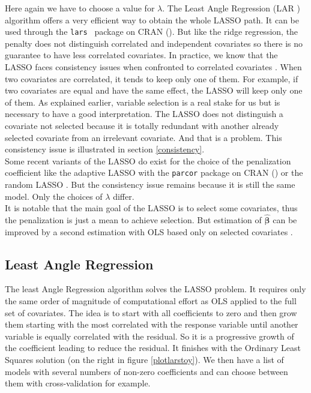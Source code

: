 \documentclass[12pt,a4paper]{report}
\begin{document}
		Here again we have to choose a value for $\lambda$.
	 The Least Angle Regression (\textsc{LAR} \cite{efron2004least}) algorithm offers a very efficient way to obtain the whole LASSO path.  It can be used through the {\tt lars } package on CRAN (\cite{packagelars}). But like the ridge regression, the penalty does not distinguish correlated and independent covariates so there is no guarantee to have less correlated covariates. In practice, we know that the LASSO faces consistency issues when confronted to correlated covariates \cite{Zhao2006MSC}. When two covariates are correlated, it tends to keep only one of them. For example, if two covariates are equal and have the same effect, the LASSO will keep only one of them. As explained earlier, variable selection is a real stake for us but is necessary to have a good interpretation. The LASSO does not distinguish a covariate not selected because it is totally redundant with another already selected covariate from an irrelevant covariate. And that is a problem. This consistency issue is illustrated in section \ref{consistency}.\\



			 Some recent variants of the \textsc{LASSO} do exist for the choice of the penalization coefficient like the adaptive \textsc{LASSO} \cite{zou2006adaptive} with the {\tt parcor} package on CRAN (\cite{packageparcor}) or the random \textsc{LASSO} \cite{wang2011random}.  But the consistency issue remains because it is still the same model. Only the choices of $\lambda$ differ.\\
			 
			 It is notable that the main goal of the LASSO is to select some covariates, thus the penalization is just a mean to achieve selection. But estimation of $\hat{\boldsymbol{\beta}}$ can be improved by a second estimation with OLS based only on selected covariates \cite{SAM10088}.
		\subsection{Least Angle Regression}
		The least Angle Regression algorithm solves the LASSO problem.
		It requires only the same order of magnitude of computational effort as \textsc{OLS} applied to the full set of covariates.
		The idea is to start with all coefficients to zero and then grow them starting with the most correlated with the response variable until another variable is equally correlated with the residual. So it is a progressive growth of the coefficient leading to reduce the residual. It finishes with the Ordinary Least Squares solution (on the right in figure \ref{plotlarstoy}). We then have a list of models with several numbers of non-zero coefficients and can choose between them with cross-validation for example.\\
		
\end{document}
